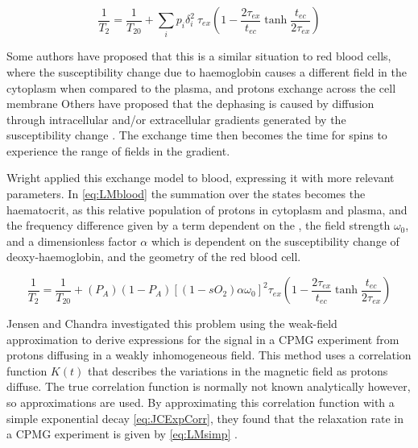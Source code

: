 \begin{equation}
\label{eq:LMchemEx}
\frac{1}{T_2} = \frac{1}{T_{20}} + \sum_i{p_i\delta_i^2}  \: \tau_{ex} \left(1 - \frac{2\tau_{ex}}{t_{ec}} \tanh{ \frac{t_{ec}}{2\tau_{ex}}}\right)
\end{equation}

Some authors have proposed that this is a similar situation to red blood cells, where the susceptibility change due to haemoglobin causes a different \Bzero field in the cytoplasm when compared to the plasma, and protons exchange across the cell membrane\cite{BryantMagneticrelaxationblood1990}
Others have proposed that the dephasing is caused by diffusion through intracellular and/or extracellular gradients generated by the susceptibility change \cite{GomoriNMRRelaxationTimes1987,BrooksComparisont2relaxation1995,BrooksT2shorteningweaklymagnetized2001}.
The exchange time then becomes the time for spins to experience the range of fields in the gradient.

Wright\cite{WrightEstimatingoxygensaturation1991} applied this exchange model to blood, expressing it with more relevant parameters.
In \autoref{eq:LMblood} the summation over the states becomes the haematocrit, as this relative population of protons in cytoplasm and plasma, and the frequency difference given by a term dependent on the \SOtwo, the field strength $\omega_0$, and a dimensionless factor $\alpha$ which is dependent on the susceptibility change of deoxy-haemoglobin, and the geometry of the red blood cell.

\begin{equation}
\label{eq:LMblood}
\frac{1}{T_2} = \frac{1}{T_{20}} + (P_A)(1 - P_A) \left[(1-sO_2)\alpha\omega_0\right]^2 \tau_{ex} \left(1 - \frac{2\tau_{ex}}{t_{ec}} \tanh{\frac{t_{ec}}{2\tau_{ex}} } \right)
\end{equation}

Jensen and Chandra investigated this problem using the weak-field approximation to derive expressions for the signal in a CPMG experiment from protons diffusing in a weakly inhomogeneous field\cite{JensenNMRrelaxationtissues2000}.
This method uses a correlation function $K(t)$ that describes the variations in the magnetic field as protons diffuse.
The true correlation function is normally not known analytically however, so approximations are used.
By approximating this correlation function with a simple exponential decay \autoref{eq:JCExpCorr}, they found that the relaxation rate in a CPMG experiment is given by \autoref{eq:LMsimp} \cite{JensenNMRrelaxationtissues2000}.


